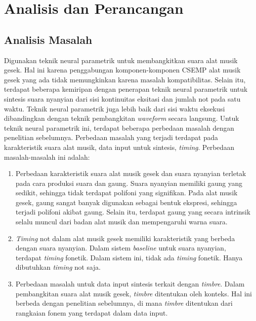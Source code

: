 \chapter{Analisis dan Perancangan} \label{design-chapter}

\section{Analisis Masalah}\label{section-problem-analysis}

Digunakan teknik neural parametrik untuk membangkitkan suara alat musik gesek. Hal ini karena penggabungan komponen-komponen CSEMP alat musik gesek yang ada tidak memungkinkan karena masalah kompatibilitas. Selain itu, terdapat beberapa kemiripan dengan penerapan teknik neural parametrik untuk sintesis suara nyanyian dari sisi kontinuitas eksitasi dan jumlah not pada satu waktu. Teknik neural parametrik juga lebih baik dari sisi waktu eksekusi dibandingkan dengan teknik pembangkitan \textit{waveform} secara langsung. Untuk teknik neural parametrik ini, terdapat beberapa perbedaan masalah dengan penelitian sebelumnya\parencite{bonada2017singing}. Perbedaan masalah yang terjadi terdapat pada karakteristik suara alat musik, data input untuk sintesis, \textit{timing}. Perbedaan masalah-masalah ini adalah:

\begin{enumerate}

\item Perbedaan karakteristik suara alat musik gesek dan suara nyanyian terletak pada cara produksi suara dan gaung. Suara nyanyian memiliki gaung yang sedikit, sehingga tidak terdapat polifoni yang signifikan. Pada alat musik gesek, gaung sangat banyak digunakan sebagai bentuk ekspresi, sehingga terjadi polifoni akibat gaung. Selain itu, terdapat gaung yang secara intrinsik selalu muncul dari badan alat musik dan mempengaruhi warna suara.

\item \textit{Timing} not dalam alat musik gesek memiliki karakteristik yang berbeda dengan suara nyanyian. Dalam sistem \textit{baseline} untuk suara nyanyian, terdapat \textit{timing} fonetik. Dalam sistem ini, tidak ada \textit{timing} fonetik. Hanya dibutuhkan \textit{timing} not saja.

\item Perbedaan masalah untuk data input sintesis terkait dengan \textit{timbre}. Dalam pembangkitan suara alat musik gesek, \textit{timbre} ditentukan oleh konteks. Hal ini berbeda dengan penelitian sebelumnya, di mana \textit{timbre} ditentukan dari rangkaian fonem yang terdapat dalam data input.

\end{enumerate}

